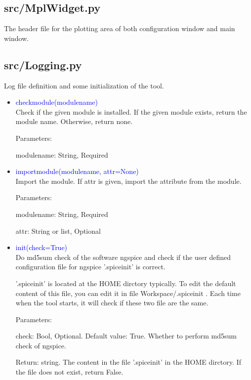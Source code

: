 \documentclass[12pt,a4paper]{article}
\begin{document}
\begin{itemize}[leftmargin=*]
\begin{itemize}
\end{itemize}


\subsection{src/MplWidget.py}
The header file for the plotting area of both configuration window and main window.

\subsection{src/Logging.py}
Log file definition and some initialization of the tool.

\begin{itemize}
    \item \textcolor{blue}{check\textunderscore module(module\textunderscore name)}\\
        Check if the given module is installed. If the given module exists, return the module name. Otherwise, return none.

        Parameters:

        module\textunderscore name: String, Required

    \item \textcolor{blue}{import\textunderscore module(module\textunderscore name, attr=None)}\\
        Import the module. If attr is given, import the attribute from the module.

        Parameters:

        module\textunderscore name: String, Required

        attr: String or list, Optional

    \item \textcolor{blue}{\hypertarget{init}{init(check=True)}}\\
        Do md5sum check of the software ngspice and check if the  user defined configuration file for ngspice '.spiceinit' is correct.

        '.spiceinit' is located at the HOME dirctory typically. To edit the default content of this file, you can edit it in file Workspace/.spiceinit . Each time when the tool starts, it will check if these two file are the same.

        Parameters:

        check: Bool, Optional. Default value: True. Whether to perform md5sum check of ngspice.

        Return: string. The content in the file '.spiceinit' in the HOME dirctory. If the file does not exist, return False.
\end{itemize}

\end{itemize}
\end{document}
